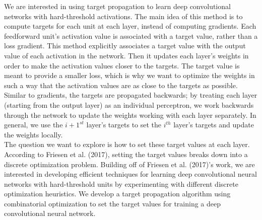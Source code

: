 \documentclass[12pt]{article}
\begin{document}
We are interested in using target propagation to learn deep convolutional networks with hard-threshold activations. The main idea of this method is to compute targets for each unit at each layer, instead of computing gradients. Each feedforward unit's activation value is associated with a target value, rather than a loss gradient. This method explicitly associates a target value with the output value of each activation in the network. Then it updates each layer's weights in order to make the activation values closer to the targets. The target value is meant to provide a smaller loss, which is why we want to optimize the weights in such a way that the activation values are as close to the targets as possible. Similar to gradients, the targets are propagated backwards; by treating each layer (starting from the output layer) as an individual perceptron, we work backwards through the network to update the weights working with each layer separately. In general, we use the $i+1^{st}$ layer's targets to set the $i^{th}$ layer's targets and update the weights locally. \\

The question we want to explore is how to set these target values at each layer. According to Friesen et al. (2017), setting the target values breaks down into a discrete optimization problem. Building off of Friesen et al. (2017)'s work, we are interested in developing efficient techniques for learning deep convolutional neural networks with hard-threshold units by experimenting with different discrete optimization heuristics. We develop a target propagation algorithm using combinatorial optimization to set the target values for training a deep convolutional neural network.  

 
\end{document}
